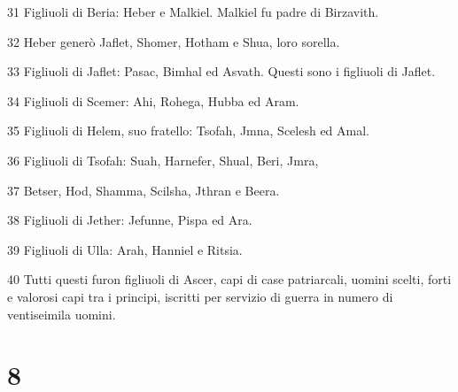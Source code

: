 \par 31 Figliuoli di Beria: Heber e Malkiel. Malkiel fu padre di Birzavith.
\par 32 Heber generò Jaflet, Shomer, Hotham e Shua, loro sorella.
\par 33 Figliuoli di Jaflet: Pasac, Bimhal ed Asvath. Questi sono i figliuoli di Jaflet.
\par 34 Figliuoli di Scemer: Ahi, Rohega, Hubba ed Aram.
\par 35 Figliuoli di Helem, suo fratello: Tsofah, Jmna, Scelesh ed Amal.
\par 36 Figliuoli di Tsofah: Suah, Harnefer, Shual, Beri, Jmra,
\par 37 Betser, Hod, Shamma, Scilsha, Jthran e Beera.
\par 38 Figliuoli di Jether: Jefunne, Pispa ed Ara.
\par 39 Figliuoli di Ulla: Arah, Hanniel e Ritsia.
\par 40 Tutti questi furon figliuoli di Ascer, capi di case patriarcali, uomini scelti, forti e valorosi capi tra i principi, iscritti per servizio di guerra in numero di ventiseimila uomini.

\chapter{8}

